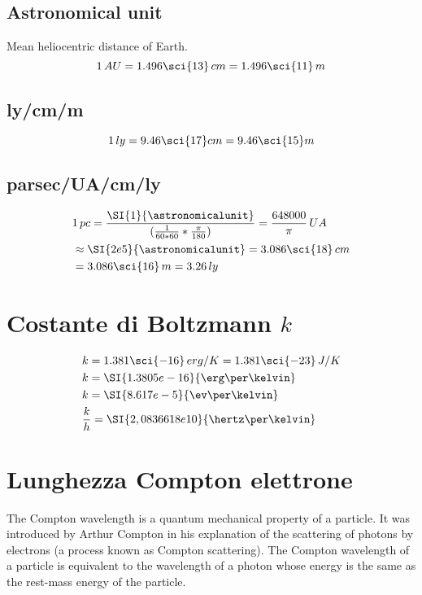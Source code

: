 \documentclass[oneside,12pt,fleqn]{memoir}
\begin{document}
\subsection{Astronomical unit}

Mean heliocentric distance of Earth.
\begin{equation*}
1\,AU=1.496\sci{13}\,cm=1.496\sci{11}\,m
\end{equation*}

\subsection{ly/cm/m}

\begin{equation*}
1\,ly=9.46\sci{17}cm=9.46\sci{15}m
\end{equation*}

\subsection{parsec/UA/cm/ly}

\begin{align*}
&1\,pc=\frac{\SI{1}{\astronomicalunit}}{(\frac{1}{60*60}*\frac{\pi}{180})}=\frac{648000}{\pi}\,UA\\
&\approx\SI{2e5}{\astronomicalunit}=3.086\sci{18}\,cm\\
&=3.086\sci{16}\,m=3.26\,ly
\end{align*}

\section{Costante di Boltzmann $k$}


\begin{align*}
&k=1.381\sci{-16}\,erg/K=1.381\sci{-23}\,J/K\\
&k=\SI{1.3805e-16}{\erg\per\kelvin}\\
&k=\SI{8.617e-5}{\ev\per\kelvin}\\
&\frac{k}{h}=\SI{2,0836618e10}{\hertz\per\kelvin}
\end{align*}

\section{Lunghezza Compton elettrone}

The Compton wavelength is a quantum mechanical property of a particle. It was introduced by Arthur Compton in his explanation of the scattering of photons by electrons (a process known as Compton scattering). The Compton wavelength of a particle is equivalent to the wavelength of a photon whose energy is the same as the rest-mass energy of the particle.
\end{document}
